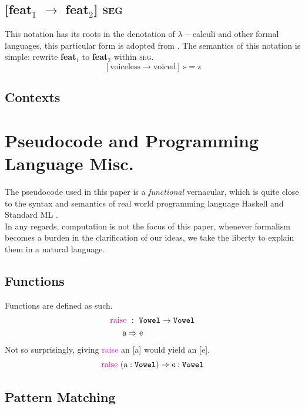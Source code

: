 \documentclass{report}[12pt]
\begin{document}
\subsection*{[feat$_1$ $\rightarrow$ feat$_2$] \textsc{seg}}

This notation has its roots in the denotation of $\lambda-$calculi and other formal languages, this particular form is adopted from \cite{tpl}. The semantics of this notation is simple: rewrite \textbf{feat}$_1$ to \textbf{feat}$_2$ within \textsc{seg}.
\[ [\text{voiceless} \rightarrow \text{voiced}]\ \text{s} = \text{z} \]

\subsection*{Contexts}

\section*{Pseudocode and Programming Language Misc.}

The pseudocode used in this paper is a \emph{functional} vernacular, which is quite close to the syntax and semantics of real world programming language Haskell \cite{haskell2010} and Standard ML \cite{def_sml}. \\
In any regards, computation is not the focus of this paper, whenever formalism becomes a burden in the clarification of our ideas, we take the liberty to explain them in a natural language.

\subsection*{Functions}

Functions are defined as such.
\begin{align*}
  \text{\textcolor{magenta}{raise}} &\ :\ \texttt{Vowel} \rightarrow \texttt{Vowel} \\
  \text{a} & \Rightarrow \text{e}
\end{align*}
Not so surprisingly, giving \textcolor{magenta}{raise} an [a] would yield an [e].
\[ \text{\textcolor{magenta}{raise}}\ (\text{a} : \texttt{Vowel}) \Rightarrow \text{e} : \texttt{Vowel} \]

\subsection*{Pattern Matching}
\end{document}
